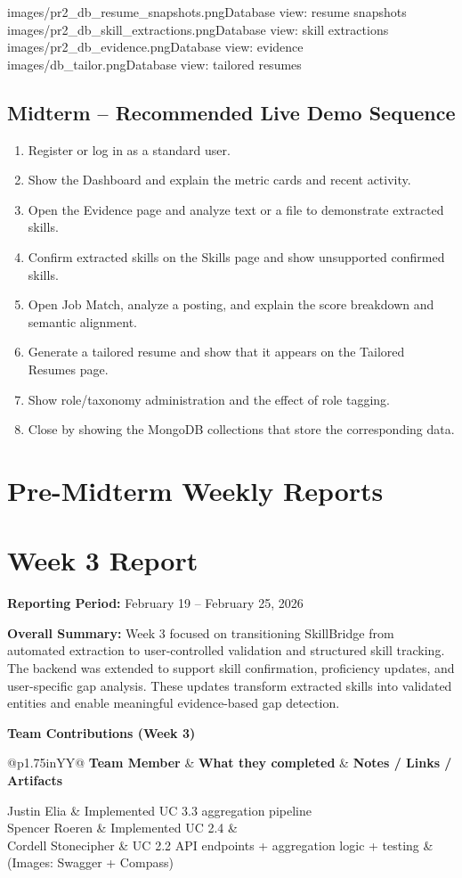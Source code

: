 \documentclass[11pt]{article}
\makeatletter
\newcommand{\WeekReport}[4]{
  \clearpage
  \section*{Week #1 Report}
  \addcontentsline{toc}{section}{Week #1 Report}
  \vspace{-0.25em}
  \noindent\textbf{Reporting Period:} #2

  \vspace{0.5em}
  \noindent\textbf{Overall Summary:} #3

  \vspace{0.75em}
  \noindent\textbf{Team Contributions (Week #1)}
  \vspace{0.25em}

  \begin{table}[H]
    \renewcommand{\arraystretch}{1.2}
    \begin{tabularx}{\linewidth}{@{}p{1.75in}YY@{}}
      \toprule
      \textbf{Team Member} & \textbf{What they completed} & \textbf{Notes / Links / Artifacts} \\
      \midrule
      #4
      \bottomrule
    \end{tabularx}
  \end{table}
}
\makeatother
\begin{document}
  {images/pr2_db_resume_snapshots.png}{Database view: resume snapshots}
  {images/pr2_db_skill_extractions.png}{Database view: skill extractions}
  {images/pr2_db_evidence.png}{Database view: evidence}
  {images/db_tailor.png}{Database view: tailored resumes}

\subsection*{Midterm -- Recommended Live Demo Sequence}
\begin{enumerate}
  \item Register or log in as a standard user.
  \item Show the Dashboard and explain the metric cards and recent activity.
  \item Open the Evidence page and analyze text or a file to demonstrate extracted skills.
  \item Confirm extracted skills on the Skills page and show unsupported confirmed skills.
  \item Open Job Match, analyze a posting, and explain the score breakdown and semantic alignment.
  \item Generate a tailored resume and show that it appears on the Tailored Resumes page.
  \item Show role/taxonomy administration and the effect of role tagging.
  \item Close by showing the MongoDB collections that store the corresponding data.
\end{enumerate}

\clearpage
\section*{Pre-Midterm Weekly Reports}

\WeekReport{3}{February 19 -- February 25, 2026}{
Week 3 focused on transitioning SkillBridge from automated extraction to user-controlled validation and structured skill tracking. The backend was extended to support skill confirmation, proficiency updates, and user-specific gap analysis. These updates transform extracted skills into validated entities and enable meaningful evidence-based gap detection.
}{
Justin Elia & Implemented UC 3.3 aggregation pipeline  \\
Spencer Roeren & Implemented UC 2.4 &  \\
Cordell Stonecipher & UC 2.2 API endpoints + aggregation logic + testing & (Images: Swagger + Compass) \\
}
\end{document}
